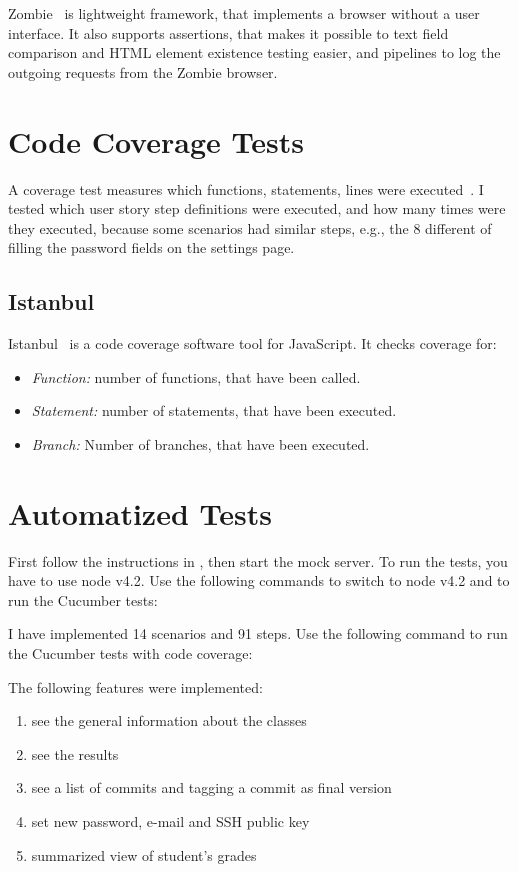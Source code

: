 Zombie~\cite{zombie} is lightweight framework, that implements a browser without a user interface. It also supports assertions, that makes it possible to text field comparison and HTML element existence testing easier, and pipelines to log the outgoing requests from the Zombie browser. 

\section{Code Coverage Tests}
A coverage test measures which functions, statements, lines were executed~\cite{szofttech}. I tested which user story step definitions were executed, and how many times were they executed, because some scenarios had similar steps, e.g., the 8 different of filling the password fields on the settings page.

\subsection{Istanbul}
Istanbul~\cite{istanbul} is a code coverage software tool for JavaScript. It checks coverage for:

\begin{itemize}
	\item \emph{Function:} number of functions, that have been called.
	\item \emph{Statement:} number of statements, that have been executed.
	\item \emph{Branch:} Number of branches, that have been executed.
\end{itemize}

\section{Automatized Tests}
First follow the instructions in , then start the mock server. To run the tests, you have to use node v4.2. Use the following commands to switch to node v4.2 and to run the Cucumber tests:


I have implemented 14 scenarios and 91 steps. Use the following command to run the Cucumber tests with code coverage:


The following features were implemented:

\begin{enumerate}
	\item see the general information about the classes
	\setcounter{enumi}{0}
	\item see the results
	\item see a list of commits and tagging a commit as final version
	\setcounter{enumi}{1}
	\item set new password, e-mail and SSH public key
	\item summarized view of student's grades
\end{enumerate}

